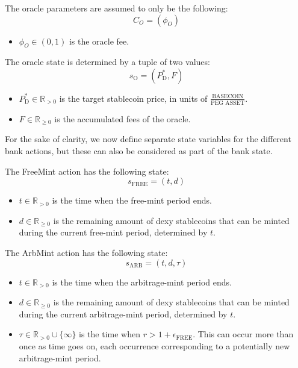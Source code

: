 \documentclass{ifcolog}
\newcommand{\Pdt}{P_{\mathrm{D}}^{*}}
\begin{document}
The oracle parameters are assumed to only be the following:
$$C_{O} = \left(\phi_{O}\right)$$

\begin{itemize}
  \item $\phi_{O} \in (0,1)$ is the oracle fee.
\end{itemize}

The oracle state is determined by a tuple of two values:
$$s_{\textrm{O}} = \left(\Pdt, F \right)$$

\begin{itemize}
  \item $\Pdt \in \mathbb{R}_{>0}$ is the target stablecoin price, in units of $\frac{\textrm{BASECOIN}}{\textrm{PEG ASSET}}$.
  \item $F \in \mathbb{R}_{\ge 0}$ is the accumulated fees of the oracle.
\end{itemize}

For the sake of clarity, we now define separate state variables for the different bank actions, 
but these can also be considered as part of the bank state.

The FreeMint action has the following state:
$$s_{\textrm{FREE}} = \left( t, d \right)$$

\begin{itemize}
  \item $t \in \mathbb{R}_{>0}$ is the time when the free-mint period ends.
  \item $d \in \mathbb{R}_{\ge0}$ is the remaining amount of dexy stablecoins that can be minted during the current free-mint period, determined by $t$.
\end{itemize}

The ArbMint action has the following state:
$$s_{\textrm{ARB}} = \left(t, d, \tau\right)$$

\begin{itemize}
  \item $t \in \mathbb{R}_{>0}$ is the time when the arbitrage-mint period ends.
  \item $d \in \mathbb{R}_{\ge 0}$ is the remaining amount of dexy stablecoins that can be minted during the current arbitrage-mint period, determined by $t$.
  \item $\tau \in \mathbb{R}_{>0}\cup\{\infty\}$ is the time when $r > 1 + \epsilon_{\textrm{FREE}}$. This can occur more than once as time goes on,
        each occurrence corresponding to a potentially new arbitrage-mint period. 
\end{itemize}
\end{document}

